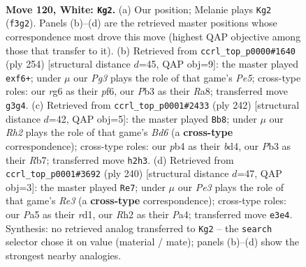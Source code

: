 \documentclass[11pt]{article}
\begin{document}
\begin{figure}[p]\centering
\begin{subfigure}{0.46\textwidth}\centering
\resizebox{\linewidth}{!}{%
\newchessgame
\chessboard[
  setfen={6k1/8/p5r1/P1p2p1p/1p3P1P/1P2PKP1/7R/8 w - - 27 120},
  showmover=false,
  pgfstyle=straightmove, color=movearrow, markmove={f3-g2}
]}
\caption{}
\end{subfigure}\hfill
\begin{subfigure}{0.46\textwidth}\centering
\resizebox{\linewidth}{!}{%
\newchessgame
\chessboard[
  setfen={R7/1r4k1/4ppp1/4P2p/5P1P/6PK/8/8 w - - 0 128},
  showmover=false,
  pgfstyle=straightmove, color=movearrow, markmove={e5-f6}
]}
\caption{}
\end{subfigure}
\\[4pt]
\begin{subfigure}{0.46\textwidth}\centering
\resizebox{\linewidth}{!}{%
\newchessgame
\chessboard[
  setfen={6k1/1R6/3B2p1/3r1pPp/3b1P1P/5PK1/8/8 w - - 25 122},
  showmover=false,
  pgfstyle=straightmove, color=movearrow, markmove={d6-b8}
]}
\caption{}
\end{subfigure}\hfill
\begin{subfigure}{0.46\textwidth}\centering
\resizebox{\linewidth}{!}{%
\newchessgame
\chessboard[
  setfen={5k2/8/n1Bp1P1p/p1p3p1/P1P3P1/1P2R2K/8/3r4 w - - 1 121},
  showmover=false,
  pgfstyle=straightmove, color=movearrow, markmove={e3-e7}
]}
\caption{}
\end{subfigure}
\caption{\textbf{Move 120, White: \texttt{Kg2}.} (a) Our position; Melanie plays \texttt{Kg2} (\texttt{f3g2}). Panels (b)--(d) are the retrieved master positions whose correspondence most drove this move (highest QAP objective among those that transfer to it). (b) Retrieved from \texttt{ccrl\_top\_p0000\#1640} (ply 254) [structural distance $d$=45, QAP obj=9]: the master played \texttt{exf6+}; under $\mu$ our \emph{Pg3} plays the role of that game's \emph{Pe5}; cross-type roles: our \emph{r}g6 as their \emph{p}f6, our \emph{P}b3 as their \emph{R}a8; transferred move \texttt{g3g4}. (c) Retrieved from \texttt{ccrl\_top\_p0001\#2433} (ply 242) [structural distance $d$=42, QAP obj=5]: the master played \texttt{Bb8}; under $\mu$ our \emph{Rh2} plays the role of that game's \emph{Bd6} (a \textbf{cross-type} correspondence); cross-type roles: our \emph{p}b4 as their \emph{b}d4, our \emph{P}b3 as their \emph{R}b7; transferred move \texttt{h2h3}. (d) Retrieved from \texttt{ccrl\_top\_p0001\#3692} (ply 240) [structural distance $d$=47, QAP obj=3]: the master played \texttt{Re7}; under $\mu$ our \emph{Pe3} plays the role of that game's \emph{Re3} (a \textbf{cross-type} correspondence); cross-type roles: our \emph{P}a5 as their \emph{r}d1, our \emph{R}h2 as their \emph{P}a4; transferred move \texttt{e3e4}. Synthesis: no retrieved analog transferred to \texttt{Kg2} -- the \texttt{search} selector chose it on value (material / mate); panels (b)--(d) show the strongest nearby analogies.}
\label{fig:thought-m238}
\end{figure}
\end{document}
